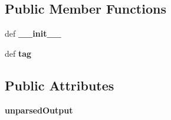 \subsection*{Public Member Functions}
\begin{DoxyCompactItemize}
\item 
\hypertarget{classcheshire3_1_1textmining_1_1_tsujii_c3_1_1_genia_object_a13e56d8a66936f2474f286c0c061916d}{def {\bfseries \-\_\-\-\_\-init\-\_\-\-\_\-}}\label{classcheshire3_1_1textmining_1_1_tsujii_c3_1_1_genia_object_a13e56d8a66936f2474f286c0c061916d}

\item 
\hypertarget{classcheshire3_1_1textmining_1_1_tsujii_c3_1_1_genia_object_a25a675eabfb4a83a7eaac88faaf38e25}{def {\bfseries tag}}\label{classcheshire3_1_1textmining_1_1_tsujii_c3_1_1_genia_object_a25a675eabfb4a83a7eaac88faaf38e25}

\end{DoxyCompactItemize}
\subsection*{Public Attributes}
\begin{DoxyCompactItemize}
\item 
\hypertarget{classcheshire3_1_1textmining_1_1_tsujii_c3_1_1_genia_object_a3c370688f67640c87c3a8df77cc57498}{{\bfseries unparsed\-Output}}\label{classcheshire3_1_1textmining_1_1_tsujii_c3_1_1_genia_object_a3c370688f67640c87c3a8df77cc57498}

\end{DoxyCompactItemize}
